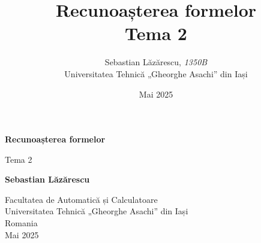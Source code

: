 \documentclass[12pt]{article}
\title{\textbf{Recunoașterea formelor} \\ \textbf{Tema 2}}
\author{Sebastian Lăzărescu, \emph{1350B} \\ Universitatea Tehnică „Gheorghe Asachi” din Iași}
\date{Mai 2025}
\begin{document}
\begin{titlepage}
    \begin{center}
        \vspace*{1cm}

        \Huge
        \textbf{Recunoașterea formelor}

        \vspace{0.5cm}
        \LARGE
        Tema 2

        \vspace{1.5cm}

        \textbf{Sebastian Lăzărescu}

        \vfill

        \Large
        Facultatea de Automatică și Calculatoare\\
        Universitatea Tehnică „Gheorghe Asachi” din Iași\\
        Romania\\
        Mai 2025
    \end{center}
\end{titlepage}
\end{document}
